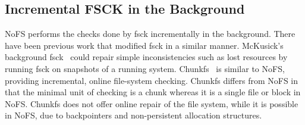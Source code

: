 \subsection{Incremental FSCK in the Background}
\label{sec-related-fsck}

NoFS performs the checks done by fsck incrementally in the background.
There have been previous work that modified fsck in a similar manner.
McKusick's background fsck~\cite{McKusick02-BackgroundFsck} could
repair simple inconsistencies such as lost resources by running fsck
on snapshots of a running system.
Chunkfs~\cite{HensonEtAl06-ChunkFSlocal} is similar to NoFS, providing
incremental, online file-system checking. Chunkfs differs from NoFS in
that the minimal unit of checking is a chunk whereas it is a single
file or block in NoFS. Chunkfs does not offer online repair of the
file system, while it is possible in NoFS, due to backpointers and
non-persistent allocation structures.
